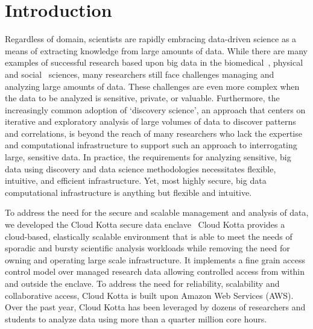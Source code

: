 \section{Introduction}

Regardless of domain, scientists are rapidly embracing data-driven science as a 
means of extracting knowledge from large amounts of data. While there are many examples
of successful research based upon big data in the biomedical~\cite{toga15big}, physical~\cite{reed15exascale}
and social~\cite{foster2015tradition} sciences, many researchers still face challenges
managing and analyzing large amounts of data. These challenges are even more complex
when the data to be analyzed is sensitive, private, or valuable. Furthermore, the increasingly common
adoption of `discovery science', an approach that centers on iterative and exploratory analysis
of large volumes of data to discover patterns and correlations, is 
beyond the reach of many researchers who lack the expertise and computational infrastructure
to support such an approach to interrogating large, sensitive data. In practice, the requirements
for analyzing sensitive, big data using discovery and data science methodologies
necessitates flexible, intuitive, and efficient infrastructure. Yet, most highly secure, big data computational infrastructure is anything but flexible and intuitive.

To address the need for the secure and scalable management and 
analysis of data, we developed the Cloud Kotta secure data enclave~\cite{babuji16secure,babuji16kotta}
Cloud Kotta provides a cloud-based, elastically scalable environment that is 
able to meet the needs of sporadic and bursty scientific analysis workloads
while removing the need for owning and operating large scale infrastructure.
It implements a fine grain access control model over managed research data 
allowing controlled access from within and outside the enclave. To address the need for reliability, scalability and collaborative access, Cloud Kotta is built upon Amazon Web Services (AWS). Over the past year, Cloud Kotta has been leveraged by dozens of researchers and students to analyze data using more than a quarter million core hours.

